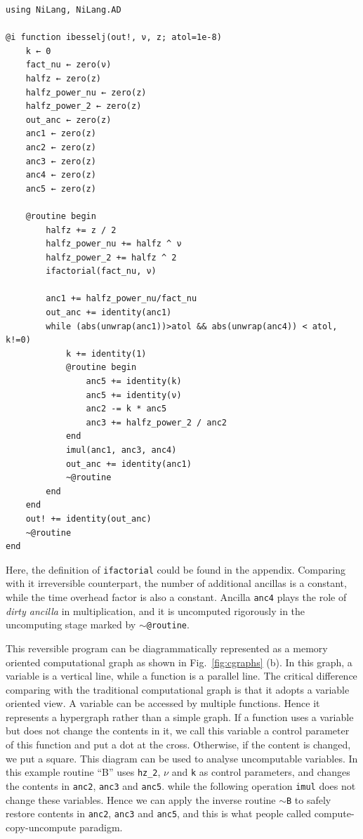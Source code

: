 \documentclass{article}
\newcommand{\<}{\langle}
\renewcommand{\>}{\rangle}
\newcommand{\Fig}[1]{Fig.~\ref{#1}}
\theoremstyle{definition}\newtheorem{definition}{\textit{Definition}}
\begin{document}
\begin{minipage}{\columnwidth}
\begin{lstlisting}[multicols=2]
using NiLang, NiLang.AD

@i function ibesselj(out!, ν, z; atol=1e-8)
    k ← 0
    fact_nu ← zero(ν)
    halfz ← zero(z)
    halfz_power_nu ← zero(z)
    halfz_power_2 ← zero(z)
    out_anc ← zero(z)
    anc1 ← zero(z)
    anc2 ← zero(z)
    anc3 ← zero(z)
    anc4 ← zero(z)
    anc5 ← zero(z)

    @routine begin
        halfz += z / 2
        halfz_power_nu += halfz ^ ν
        halfz_power_2 += halfz ^ 2
        ifactorial(fact_nu, ν)

        anc1 += halfz_power_nu/fact_nu
        out_anc += identity(anc1)
        while (abs(unwrap(anc1))>atol && abs(unwrap(anc4)) < atol, k!=0)
            k += identity(1)
            @routine begin
                anc5 += identity(k)
                anc5 += identity(ν)
                anc2 -= k * anc5
                anc3 += halfz_power_2 / anc2
            end
            imul(anc1, anc3, anc4)
            out_anc += identity(anc1)
            ~@routine
        end
    end
    out! += identity(out_anc)
    ~@routine
end
\end{lstlisting}
\end{minipage}

Here, the definition of \texttt{ifactorial} could be found in the appendix. Comparing with it irreversible counterpart, the number of additional ancillas is a constant, while the time overhead factor is also a constant.
Ancilla \texttt{anc4} plays the role of \textit{dirty ancilla} in multiplication, and it is uncomputed rigorously in the uncomputing stage marked by \texttt{$\sim$@routine}.

This reversible program can be diagrammatically represented as a memory oriented computational graph as shown in \Fig{fig:cgraphs} (b).
In this graph, a variable is a vertical line, while a function is a parallel line.
The critical difference comparing with the traditional computational graph is that it adopts a variable oriented view.
A variable can be accessed by multiple functions. Hence it represents a hypergraph rather than a simple graph.
If a function uses a variable but does not change the contents in it, we call this variable a control parameter of this function and put a dot at the cross. Otherwise, if the content is changed, we put a square.
This diagram can be used to analyse uncomputable variables. In this example routine ``B'' uses \texttt{hz\_2}, \texttt{$\nu$} and \texttt{k} as control parameters, and changes the contents in \texttt{anc2}, \texttt{anc3} and \texttt{anc5}.
while the following operation \texttt{imul} does not change these variables.
Hence we can apply the inverse routine \texttt{$\sim$B} to safely restore contents in \texttt{anc2}, \texttt{anc3} and \texttt{anc5}, and this is what people called compute-copy-uncompute paradigm.
\end{document}
